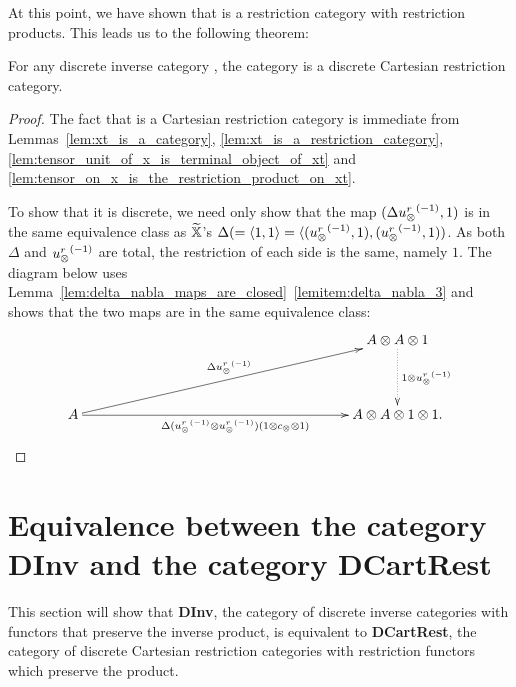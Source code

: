 
At this point, we have shown that \Xt is a restriction category with restriction products. This
leads us to the following theorem:

\begin{theorem}\label{thm:xt_is_a_discrete_crc_when_x_is_an_inverse_category}
  For any discrete inverse category \X, the category \Xt is a discrete Cartesian restriction category.
\end{theorem}
\begin{proof}
  The fact that \Xt is a Cartesian restriction category is immediate from
  Lemmas~\ref{lem:xt_is_a_category}, \ref{lem:xt_is_a_restriction_category},
  \ref{lem:tensor_unit_of_x_is_terminal_object_of_xt} and
  \ref{lem:tensor_on_x_is_the_restriction_product_on_xt}.

  To show that it is discrete, we need only show that the map $(\Delta {\ensuremath{u_{\otimes}^r}}^{(-1)},1)$ is in the
  same equivalence class as $\widetilde{\mathbb{X}}$'s $\Delta(= \langle1,1\rangle = \langle({u_{\otimes}^r}^{(-1)},1),({u_{\otimes}^r}^{(-1)},1))$. As both
  $\Delta$ and ${u_{\otimes}^r}^{(-1)}$ are total, the restriction of each side is the same, namely $1$. The
  diagram below uses Lemma~\ref{lem:delta_nabla_maps_are_closed}~\ref{lemitem:delta_nabla_3} and
  shows that the two maps are in the same equivalence class:
  \[
    \xymatrix @C=190pt @R=40pt{
      & A \* A \* 1 \ar@{.>}[d]^{1\*\inv{\usr}}\\
      A \ar[ur]^{\Delta\inv{\usr}}
        \ar[r]_{\Delta(\inv{\usr}\*\inv{\usr})(1\*c_{\*}\*1)}& A\*A\*1\*1.
    }
  \]
\end{proof}
\section{Equivalence between the category  {\bf DInv} and the category {\bf DCartRest}} %
\label{sec:equivalence_of_categories}

This section will show that {\bf DInv}, the category of discrete inverse categories with functors
that preserve the inverse product, is equivalent to {\bf DCartRest}, the category of discrete
Cartesian restriction categories with restriction functors which preserve the product.

